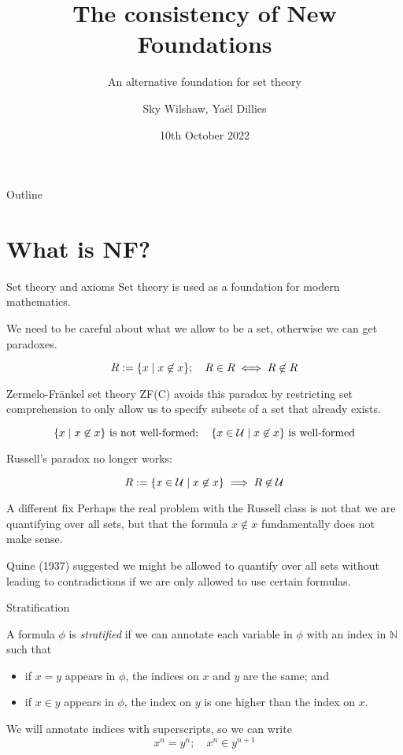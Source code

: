 \documentclass[xcolor=dvipsnames]{beamer}
\title{The consistency of New Foundations}
\subtitle{An alternative foundation for set theory}
\author{Sky Wilshaw, Ya\"el Dillies}
\institute{University of Cambridge}
\date{10th October 2022}
\begin{document}
\begin{frame}
    \titlepage
\end{frame}

\begin{frame}{Outline}
    \tableofcontents[hideallsubsections]
\end{frame}

\section{What is NF?}

\begin{frame}{Set theory and axioms}
    Set theory is used as a foundation for modern mathematics.

    \medskip

    We need to be careful about what we allow to be a set, otherwise we can get paradoxes.

    \[ R := \qty{x\mid x\not\in x};\quad R \in R \iff R \not\in R \]
\end{frame}
\begin{frame}{Zermelo-Fr\"ankel set theory}
    ZF(C) avoids this paradox by restricting set comprehension to only allow us to specify subsets of a set that already exists.

    \[ \qty{x\mid x \not\in x} \text{ is not well-formed};\quad \qty{x\in \mathcal U\mid x \not\in x} \text{ is well-formed} \]

    Russell's paradox no longer works:

    \[ R := \qty{x\in\mathcal U\mid x \not\in x} \implies R \not\in \mathcal U \]
\end{frame}
\begin{frame}{A different fix}
    Perhaps the real problem with the Russell class is not that we are quantifying over all sets, but that the formula \( x \not\in x \) fundamentally does not make sense.

    \medskip

    Quine (1937) suggested we might be allowed to quantify over all sets without leading to contradictions if we are only allowed to use certain formulas.
\end{frame}
\begin{frame}{Stratification}
    \begin{definition}
        A formula \( \phi \) is \emph{stratified} if we can annotate each variable in \( \phi \) with an index in \( \mathbb N \) such that
        \begin{itemize}
            \item if \( x = y \) appears in \( \phi \), the indices on \( x \) and \( y \) are the same; and
            \item if \( x \in y \) appears in \( \phi \), the index on \( y \) is one higher than the index on \( x \).
        \end{itemize}
    \end{definition}
    We will annotate indices with superscripts, so we can write
    \[ x^n = y^n;\quad x^n \in y^{n+1} \]
\end{frame}
\end{document}
